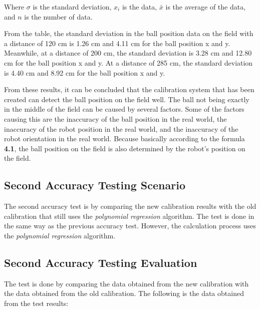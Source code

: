Where $\sigma$ is the standard deviation, $x_i$ is the data, $\bar{x}$ is the average of the data, and $n$ is the number of data.

From the table, the standard deviation in the ball position data on the field with a distance of 120 cm is 1.26 cm and 4.11 cm for the ball position x and y. Meanwhile, at a distance of 200 cm, the standard deviation is 3.28 cm and 12.80 cm for the ball position x and y. At a distance of 285 cm, the standard deviation is 4.40 cm and 8.92 cm for the ball position x and y. 

From these results, it can be concluded that the calibration system that has been created can detect the ball position on the field well. The ball not being exactly in the middle of the field can be caused by several factors. Some of the factors causing this are the inaccuracy of the ball position in the real world, the inaccuracy of the robot position in the real world, and the inaccuracy of the robot orientation in the real world. Because basically according to the formula \textbf{4.1}, the ball position on the field is also determined by the robot's position on the field.

\subsection{Second Accuracy Testing Scenario}
\label{sec:skenariopengujian2}

The second accuracy test is by comparing the new calibration results with the old calibration that still uses the \emph{polynomial regression} algorithm. The test is done in the same way as the previous accuracy test. However, the calculation process uses the \emph{polynomial regression} algorithm.

\subsection{Second Accuracy Testing Evaluation}
\label{sec:analisispengujian2}

The test is done by comparing the data obtained from the new calibration with the data obtained from the old calibration. The following is the data obtained from the test results: 

